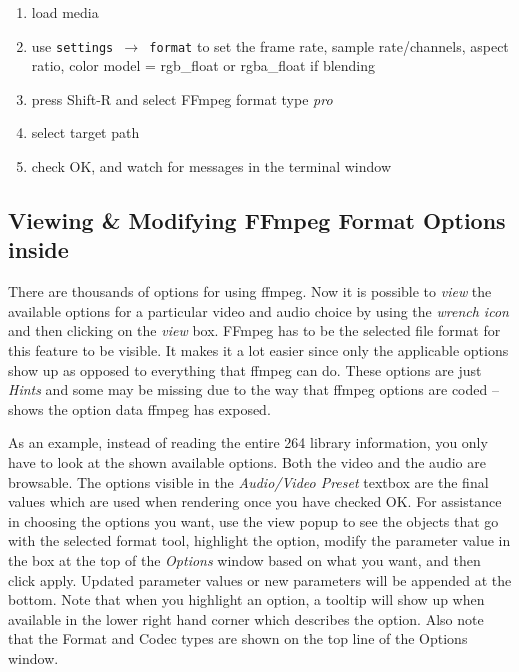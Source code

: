 \begin{enumerate}
    \item load media
    \item use \texttt{settings $\rightarrow$ format} to set the frame rate, sample rate/channels, aspect ratio, 
    color model = rgb\_float or rgba\_float if blending
    \item press Shift-R and select FFmpeg format type \textit{pro}
    \item select target path
    \item check OK, and watch for messages in the terminal window
\end{enumerate}

\subsection{Viewing \& Modifying FFmpeg Format Options inside \CGG{}}%
\label{sub:viewing_modifying_ffmpeg_cinelerra}

There are thousands of options for using ffmpeg.  Now it is possible to \textit{view} the available options for a particular video and audio choice by using the \textit{wrench icon} and then clicking on the \textit{view} box.  FFmpeg has to be the selected file format for this feature to be visible.  It makes it a lot easier since only the applicable options show up as opposed to everything that ffmpeg can do.  These options are just \textit{Hints} and some may be missing due to the way that ffmpeg options are coded -- \CGG{} shows the option data ffmpeg has exposed.

As an example, instead of reading the entire 264 library information, you only have to look at the shown available options.  Both the video and the audio are browsable. The options visible in the \textit{Audio/Video Preset} textbox are the final values which are used when rendering once you have checked OK.  For assistance in choosing the options you want, use the view popup to see the objects that go with the selected format tool, highlight the option, modify the parameter value in the box at the top of the \textit{Options} window based on what you want, and then click apply.  Updated parameter values or new parameters will be appended at the bottom.  Note that when you highlight an option, a tooltip will show up when available in the lower right hand corner which describes the option.  Also note that the Format and Codec types are shown on the top line of the Options window.

